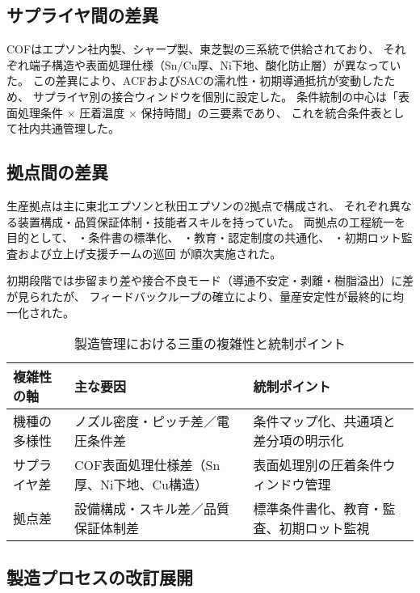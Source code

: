 \documentclass[conference]{IEEEtran}
\begin{document}
\subsection{サプライヤ間の差異}
COFはエプソン社内製、シャープ製、東芝製の三系統で供給されており、  
それぞれ端子構造や表面処理仕様（Sn/Cu厚、Ni下地、酸化防止層）が異なっていた。  
この差異により、ACFおよびSACの濡れ性・初期導通抵抗が変動したため、  
サプライヤ別の接合ウィンドウを個別に設定した。  
条件統制の中心は「表面処理条件 × 圧着温度 × 保持時間」の三要素であり、  
これを統合条件表として社内共通管理した。

\subsection{拠点間の差異}
生産拠点は主に東北エプソンと秋田エプソンの2拠点で構成され、  
それぞれ異なる装置構成・品質保証体制・技能者スキルを持っていた。  
両拠点の工程統一を目的として、  
・条件書の標準化、  
・教育・認定制度の共通化、  
・初期ロット監査および立上げ支援チームの巡回  
が順次実施された。  

初期段階では歩留まり差や接合不良モード（導通不安定・剥離・樹脂溢出）に差が見られたが、  
フィードバックループの確立により、量産安定性が最終的に均一化された。

\begin{table}[t]
\centering
\footnotesize
\caption{製造管理における三重の複雑性と統制ポイント}
\label{tab:complexity}
\renewcommand{\arraystretch}{1.1}
\begin{tabularx}{\columnwidth}{@{}p{2.3cm} Y Y@{}}
\toprule
複雑性の軸 & 主な要因 & 統制ポイント \\
\midrule
機種の多様性 &
ノズル密度・ピッチ差／電圧条件差 &
条件マップ化、共通項と差分項の明示化 \\
\addlinespace[2pt]
サプライヤ差 &
COF表面処理仕様差（Sn厚、Ni下地、Cu構造） &
表面処理別の圧着条件ウィンドウ管理 \\
\addlinespace[2pt]
拠点差 &
設備構成・スキル差／品質保証体制差 &
標準条件書化、教育・監査、初期ロット監視 \\
\bottomrule
\end{tabularx}
\end{table}

\subsection{製造プロセスの改訂展開}
\end{document}
